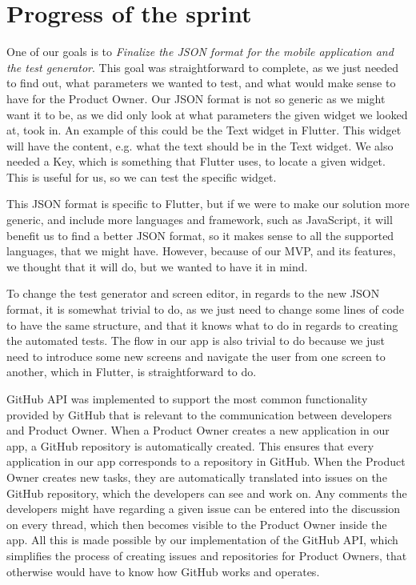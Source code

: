 \section{Progress of the sprint}

One of our goals is to \textit{Finalize the JSON format for the mobile application and the test generator}.
This goal was straightforward to complete, as we just needed to find out, what parameters we wanted to test, and what would make sense to have for the Product Owner.
Our JSON format is not so generic as we might want it to be, as we did only look at what parameters the given widget we looked at, took in.
An example of this could be the Text widget in Flutter.
This widget will have the content, e.g. what the text should be in the Text widget.
We also needed a Key, which is something that Flutter uses, to locate a given widget. 
This is useful for us, so we can test the specific widget.

This JSON format is specific to Flutter, but if we were to make our solution more generic, and include more languages and framework, such as JavaScript, it will benefit us to find a better JSON format, so it makes sense to all the supported languages, that we might have.
However, because of our MVP, and its features, we thought that it will do, but we wanted to have it in mind.

To change the test generator and screen editor, in regards to the new JSON format, it is somewhat trivial to do, as we just need to change some lines of code to have the same structure, and that it knows what to do in regards to creating the automated tests.
The flow in our app is also trivial to do because we just need to introduce some new screens and navigate the user from one screen to another, which in Flutter, is straightforward to do.

GitHub API was implemented to support the most common functionality provided by GitHub that is relevant to the communication between developers and Product Owner.
When a Product Owner creates a new application in our app, a GitHub repository is automatically created.
This ensures that every application in our app corresponds to a repository in GitHub. 
When the Product Owner creates new tasks, they are automatically translated into issues on the GitHub repository, which the developers can see and work on. 
Any comments the developers might have regarding a given issue can be entered into the discussion on every thread, which then becomes visible to the Product Owner inside the app.
All this is made possible by our implementation of the GitHub API, which simplifies the process of creating issues and repositories for Product Owners, that otherwise would have to know how GitHub works and operates.